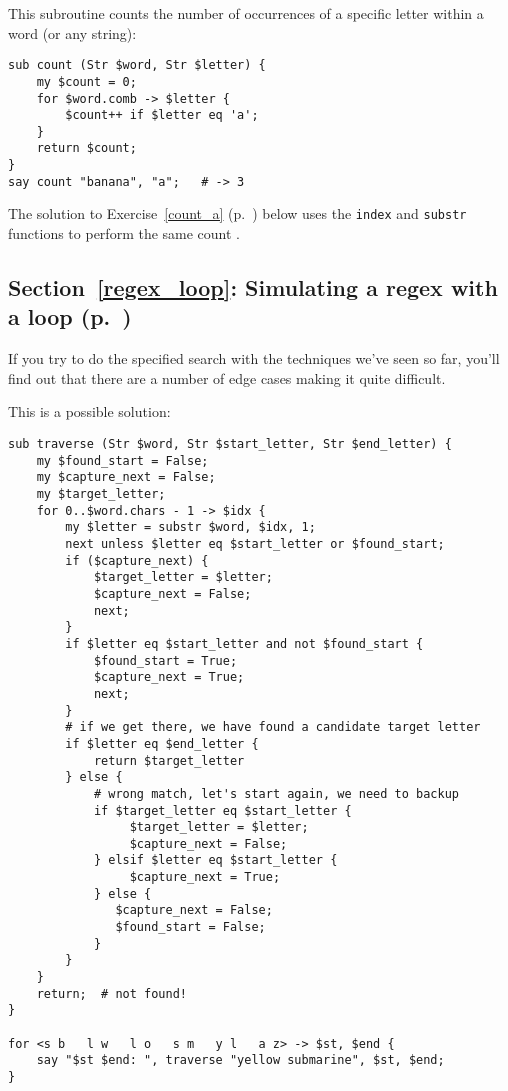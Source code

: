 This subroutine counts the number of occurrences of 
a specific letter within a word (or any string):

\begin{verbatim}
sub count (Str $word, Str $letter) {
    my $count = 0;
    for $word.comb -> $letter {
        $count++ if $letter eq 'a';
    }
    return $count;   
}
say count "banana", "a";   # -> 3
\end{verbatim}
%

The solution to Exercise~\ref{count_a} 
(p.~\pageref{sol_count_a}) below uses the 
{\tt index} and {\tt substr} functions to perform 
the same count .


\subsection{Section~\ref{regex_loop}: Simulating a regex with a loop (p.~\pageref{regex_loop})}
\label{sol_regex_loop}

If you try to do the specified search with the techniques 
we've seen so far, you'll find out that there are a number 
of edge cases making it quite difficult.

This is a possible solution:

\begin{verbatim}
sub traverse (Str $word, Str $start_letter, Str $end_letter) {
    my $found_start = False;
    my $capture_next = False;
    my $target_letter;
    for 0..$word.chars - 1 -> $idx {
        my $letter = substr $word, $idx, 1;
        next unless $letter eq $start_letter or $found_start;
        if ($capture_next) {
            $target_letter = $letter;
            $capture_next = False;
            next;
        }
        if $letter eq $start_letter and not $found_start {
            $found_start = True;
            $capture_next = True;
            next;
        }
        # if we get there, we have found a candidate target letter
        if $letter eq $end_letter {
            return $target_letter
        } else {
            # wrong match, let's start again, we need to backup
            if $target_letter eq $start_letter {
                 $target_letter = $letter;
                 $capture_next = False;
            } elsif $letter eq $start_letter {
                 $capture_next = True;
            } else {
               $capture_next = False;
               $found_start = False;
            } 
        } 
    }
    return;  # not found!
}          

for <s b   l w   l o   s m   y l   a z> -> $st, $end {
    say "$st $end: ", traverse "yellow submarine", $st, $end;  
}
\end{verbatim}

